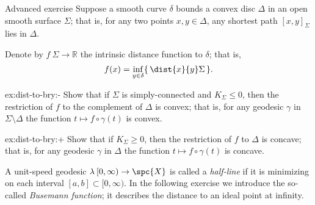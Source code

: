 










\begin{thm}{Advanced exercise}\label{ex:dist-to-bry}
Suppose a smooth curve $\delta$ bounds a convex disc $\Delta$ in an open smooth surface $\Sigma$;
that is, for any two points $x,y\in\Delta$, any shortest path $[x,y]_\Sigma$ lies in $\Delta$.

Denote by $f\:\Sigma\to\mathbb{R}$ the intrinsic distance function to $\delta$;
that is, 
\[f(x)=\inf_{y\in\delta}\{\,\dist{x}{y}\Sigma\,\}.\]

\begin{subthm}{ex:dist-to-bry:-}
Show that if $\Sigma$ is simply-connected and $K_\Sigma\le 0$, then the restriction of $f$ to the complement of $\Delta$ is convex;
that is, for any geodesic $\gamma$ in $\Sigma\setminus\Delta$ the function $t\mapsto f\circ\gamma(t)$ is convex.
\end{subthm}

\begin{subthm}{ex:dist-to-bry:+}
Show that if $K_\Sigma\ge 0$, then the restriction of $f$ to $\Delta$ is concave;
that is, for any geodesic $\gamma$ in $\Delta$ the function $t\mapsto f\circ\gamma(t)$ is concave.
\end{subthm}

\end{thm}

A unit-speed geodesic $\lambda\:[0,\infty)\to \spc{X}$ is called a \emph{half-line} if it is minimizing on each interval $[a,b]\subset [0,\infty)$.
In the following exercise we introduce the so-called
{}\emph{Busemann function};
it describes the distance to an ideal point at infinity.

